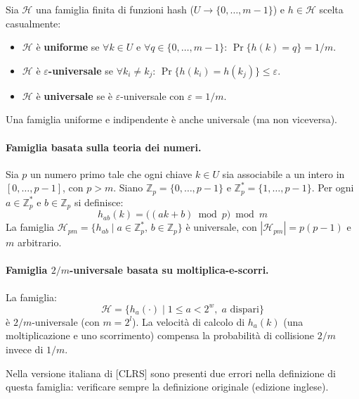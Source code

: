 \begin{definizione}
	Sia $\mathcal{H}$ una famiglia finita di funzioni hash
	($U \to \{0,\ldots,m-1\}$) e $h \in \mathcal{H}$ scelta casualmente:
	\begin{itemize}
		\item $\mathcal{H}$ è \textbf{uniforme} se $\forall k \in U$ e
		$\forall q \in \{0,\ldots,m-1\}$: $\Pr\{h(k)=q\} = 1/m$.
		\item $\mathcal{H}$ è $\varepsilon$\textbf{-universale} se
		$\forall k_i \ne k_j$:
		$\Pr\{h(k_i)=h(k_j)\} \le \varepsilon$.
		\item $\mathcal{H}$ è \textbf{universale} se è
		$\varepsilon$-universale con $\varepsilon = 1/m$.
	\end{itemize}
	Una famiglia uniforme e indipendente è anche universale (ma non viceversa).
\end{definizione}

\paragraph{Famiglia basata sulla teoria dei numeri.}
Sia $p$ un numero primo tale che ogni chiave $k \in U$ sia associabile a un
intero in $[0,\ldots,p-1]$, con $p > m$. Siano
$\mathbb{Z}_p = \{0,\ldots,p-1\}$ e $\mathbb{Z}_p^* = \{1,\ldots,p-1\}$.
Per ogni $a \in \mathbb{Z}_p^*$ e $b \in \mathbb{Z}_p$ si definisce:
\[
h_{ab}(k) = \bigl((ak + b) \bmod p\bigr) \bmod m
\]
La famiglia $\mathcal{H}_{pm} = \{h_{ab} \mid a \in \mathbb{Z}_p^*,\,
b \in \mathbb{Z}_p\}$ è universale, con $|\mathcal{H}_{pm}| = p(p-1)$ e
$m$ arbitrario.

\paragraph{Famiglia $2/m$-universale basata su moltiplica-e-scorri.}
La famiglia:
\[
\mathcal{H} = \bigl\{h_a(\cdot) \;\big|\; 1 \le a < 2^w,\;
a \text{ dispari}\bigr\}
\]
è $2/m$-universale (con $m = 2^l$). La velocità di calcolo di $h_a(k)$
(una moltiplicazione e uno scorrimento) compensa la probabilità di collisione
$2/m$ invece di $1/m$.

\begin{hardnote}
	Nella versione italiana di [CLRS] sono presenti due errori nella definizione
	di questa famiglia: verificare sempre la definizione originale (edizione
	inglese).
\end{hardnote}

